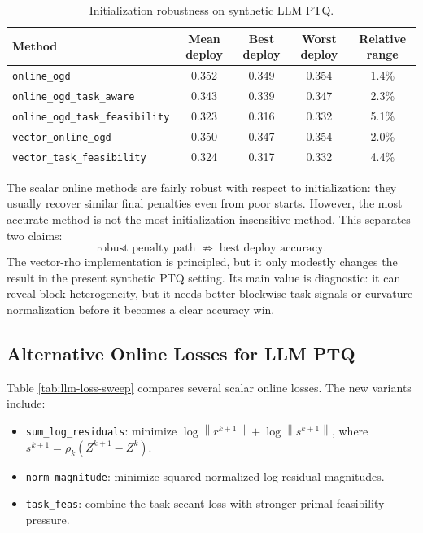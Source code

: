 \documentclass[11pt]{article}
\newcommand{\norm}[1]{\left\lVert #1 \right\rVert}
\begin{document}
\begin{table}[h]
\centering
\caption{Initialization robustness on synthetic LLM PTQ.}
\label{tab:rho-robustness}
\begin{tabular}{lcccc}
\toprule
Method & Mean deploy & Best deploy & Worst deploy & Relative range\\
\midrule
\texttt{online\_ogd} & 0.352 & 0.349 & 0.354 & 1.4\%\\
\texttt{online\_ogd\_task\_aware} & 0.343 & 0.339 & 0.347 & 2.3\%\\
\texttt{online\_ogd\_task\_feasibility} & 0.323 & 0.316 & 0.332 & 5.1\%\\
\texttt{vector\_online\_ogd} & 0.350 & 0.347 & 0.354 & 2.0\%\\
\texttt{vector\_task\_feasibility} & 0.324 & 0.317 & 0.332 & 4.4\%\\
\bottomrule
\end{tabular}
\end{table}

The scalar online methods are fairly robust with respect to initialization:
they usually recover similar final penalties even from poor starts.  However,
the most accurate method is not the most initialization-insensitive method.
This separates two claims:
\[
    \text{robust penalty path}
    \;\not\Rightarrow\;
    \text{best deploy accuracy}.
\]
The vector-rho implementation is principled, but it only modestly changes the
result in the present synthetic PTQ setting.  Its main value is diagnostic:
it can reveal block heterogeneity, but it needs better blockwise task signals
or curvature normalization before it becomes a clear accuracy win.

\subsection{Alternative Online Losses for LLM PTQ}

Table \ref{tab:llm-loss-sweep} compares several scalar online losses.  The
new variants include:
\begin{itemize}
    \item \texttt{sum\_log\_residuals}: minimize
    \(\log\norm{r^{k+1}}+\log\norm{s^{k+1}}\), where
    \(s^{k+1}=\rho_k(Z^{k+1}-Z^k)\).
    \item \texttt{norm\_magnitude}: minimize squared normalized log residual
    magnitudes.
    \item \texttt{task\_feas}: combine the task secant loss with stronger
    primal-feasibility pressure.
\end{itemize}
\end{document}
